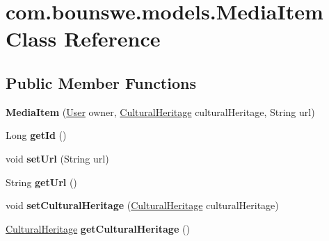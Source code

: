 \hypertarget{classcom_1_1bounswe_1_1models_1_1_media_item}{}\section{com.\+bounswe.\+models.\+Media\+Item Class Reference}
\label{classcom_1_1bounswe_1_1models_1_1_media_item}
\subsection*{Public Member Functions}
\begin{DoxyCompactItemize}
\item 
\mbox{\label{classcom_1_1bounswe_1_1models_1_1_media_item_a95c1c858582917ff0977ecb0a3eeea41}} 
{\bfseries Media\+Item} (\hyperlink{classcom_1_1bounswe_1_1models_1_1_user}{User} owner, \hyperlink{classcom_1_1bounswe_1_1models_1_1_cultural_heritage}{Cultural\+Heritage} cultural\+Heritage, String url)
\item 
\mbox{\label{classcom_1_1bounswe_1_1models_1_1_media_item_aa71764d546a8dffb25eb7c481ffc7abd}} 
Long {\bfseries get\+Id} ()
\item 
\mbox{\label{classcom_1_1bounswe_1_1models_1_1_media_item_ac9644f23a6311ff21085ddcb283a4cbf}} 
void {\bfseries set\+Url} (String url)
\item 
\mbox{\label{classcom_1_1bounswe_1_1models_1_1_media_item_a582f2cbf13f81d4ce9f9b1001f05626a}} 
String {\bfseries get\+Url} ()
\item 
\mbox{\label{classcom_1_1bounswe_1_1models_1_1_media_item_acae097a89780292100f53c364c7c0d3f}} 
void {\bfseries set\+Cultural\+Heritage} (\hyperlink{classcom_1_1bounswe_1_1models_1_1_cultural_heritage}{Cultural\+Heritage} cultural\+Heritage)
\item 
\mbox{\label{classcom_1_1bounswe_1_1models_1_1_media_item_a2d43592e394782cdef7ecd2c22ae3632}} 
\hyperlink{classcom_1_1bounswe_1_1models_1_1_cultural_heritage}{Cultural\+Heritage} {\bfseries get\+Cultural\+Heritage} ()

\end{DoxyCompactItemize}

